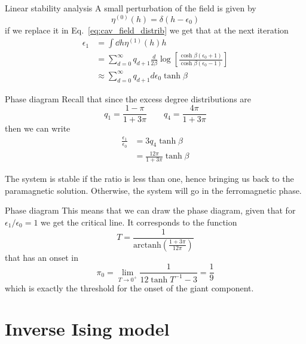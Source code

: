\documentclass[handout]{beamer}
\newcommand{\arctanh}{\text{arctanh}}
\begin{document}
\begin{frame}{Linear stability analysis}
    A small perturbation of the field is given by
    \begin{equation}
        \eta^{(0)} (h) = \delta(h-\epsilon_0)
    \end{equation}
    if we replace it in Eq.~\ref{eq:cav_field_distrib} we get that at the next
    iteration
    \begin{align}
        \epsilon_1 &= \int \dd{h} \eta^{(1)}(h) h\\
                   &= \sum_{d=0}^{\infty} q_{d+1} \frac{d}{2\beta} \log \left[
                       \frac{\cosh{\beta(\epsilon_0+1)}}{\cosh{\beta(\epsilon_0-1)}}
                   \right]\\
                   &\approx \sum_{d=0}^{\infty} q_{d+1} d \epsilon_0
                   \tanh{\beta}
    \end{align}
\end{frame}

\begin{frame}{Phase diagram}
    Recall that since the excess degree distributions are
    $$
    q_1 = \frac{1-\pi}{1+3\pi} \qquad q_4 = \frac{4\pi}{1+3\pi}
    $$
    then we can write
    \begin{align}
        \frac{\epsilon_1}{\epsilon_0} &= 3q_4 \tanh{\beta}\\
                                      &= \frac{12\pi}{1+3\pi} \tanh{\beta}
    \end{align}

    The system is \alert{stable} if the ratio is less than one, hence bringing
    us back to the \alert{paramagnetic} solution. Otherwise, the system will go
    in the ferromagnetic phase.

\end{frame}

\begin{frame}{Phase diagram}
    This means that we can draw the phase diagram, given that for $\epsilon_1 /
    \epsilon_0 = 1$ we get the critical line. It corresponds to the function
    $$
        T = \frac{1}{\arctanh \left( \frac{1+3\pi}{12\pi} \right)}
    $$
    that has an onset in
    $$
        \pi_0 = \lim_{T\to 0^+} \frac{1}{12\tanh{T^{-1}}-3} = \frac{1}{9}
    $$
    which is exactly the threshold for the onset of the giant component.
\end{frame}

\section{Inverse Ising model}
\end{document}
